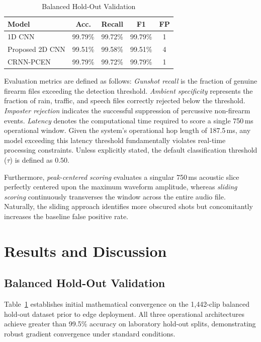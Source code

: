 \documentclass[conference]{IEEEtran}
\begin{document}
\begin{table}[!t]
\centering
\caption{Balanced Hold-Out Validation}
\label{tab:holdout}
\footnotesize
\begin{tabular}{lcccc}
\toprule
\textbf{Model} & \textbf{Acc.} & \textbf{Recall} & \textbf{F1} & \textbf{FP} \\
\midrule
1D CNN & 99.79\% & 99.72\% & 99.79\% & 1 \\
Proposed 2D CNN & 99.51\% & 99.58\% & 99.51\% & 4 \\
CRNN-PCEN & 99.79\% & 99.72\% & 99.79\% & 1 \\
\bottomrule
\end{tabular}
\end{table}

Evaluation metrics are defined as follows: \textit{Gunshot recall} is the fraction of genuine firearm files exceeding the detection threshold. \textit{Ambient specificity} represents the fraction of rain, traffic, and speech files correctly rejected below the threshold. \textit{Imposter rejection} indicates the successful suppression of percussive non-firearm events. \textit{Latency} denotes the computational time required to score a single 750\,ms operational window. Given the system's operational hop length of 187.5\,ms, any model exceeding this latency threshold fundamentally violates real-time processing constraints. Unless explicitly stated, the default classification threshold ($\tau$) is defined as $0.50$.

Furthermore, \textit{peak-centered scoring} evaluates a singular 750\,ms acoustic slice perfectly centered upon the maximum waveform amplitude, whereas \textit{sliding scoring} continuously transverses the window across the entire audio file. Naturally, the sliding approach identifies more obscured shots but concomitantly increases the baseline false positive rate.

\section{Results and Discussion}
\label{sec:results}

\subsection{Balanced Hold-Out Validation}
Table~\ref{tab:holdout} establishes initial mathematical convergence on the 1,442-clip balanced hold-out dataset prior to edge deployment. All three operational architectures achieve greater than 99.5\% accuracy on laboratory hold-out splits, demonstrating robust gradient convergence under standard conditions.
\end{document}
